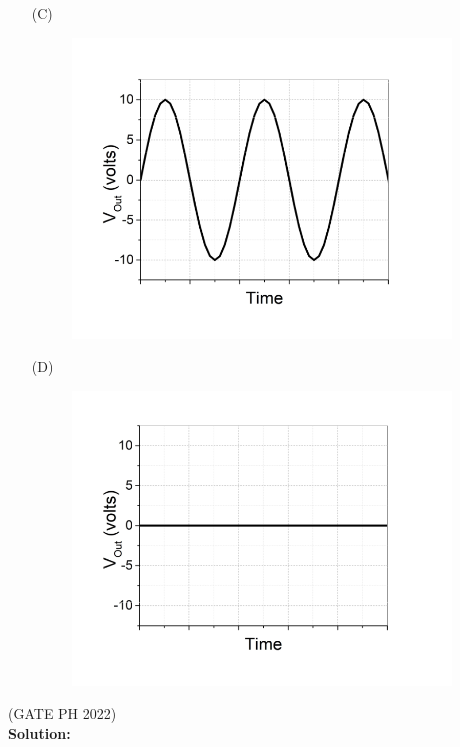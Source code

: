 \documentclass[journal,12pt,twocolumn]{IEEEtran}
\begin{document}
\begin{enumerate}
  \item[(C)]
  \setcounter{figure}{2}
    \begin{figure}[h]
        \centering
        \includegraphics[width=0.8\linewidth]{figs/3.png}
        \label{fig:avv_label}
    \end{figure}
    
  \item[(D)]
  \setcounter{figure}{3}
    \begin{figure}[h]
        \centering
        \includegraphics[width=0.8\linewidth]{figs/4.png}
        \label{fig:abb_label}
    \end{figure}
\end{enumerate}

\hfill{(GATE PH 2022)}\\
\textbf{Solution:} \\
\end{document}
